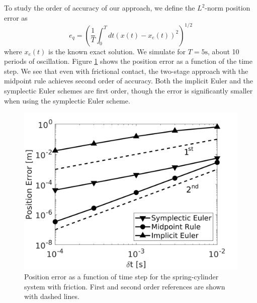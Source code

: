 To study the order of accuracy of our approach, we define the $L^2$-norm
position error as
\begin{equation*}
    e_q = \left(\frac{1}{T}\int_0^T dt(x(t)-x_e(t))^2\right)^{1/2}
\end{equation*}
where $x_e(t)$ is the known exact solution. We simulate for $T=5\text{s}$, about
10 periods of oscillation. Figure \ref{fig:spring_cylinder_position_error} shows
the position error as a function of the time step. We see that even with
frictional contact, the two-stage approach with the midpoint rule achieves
second order of accuracy. Both the implicit Euler and the symplectic Euler
schemes are first order, though the error is significantly smaller when using
the symplectic Euler scheme.
\begin{figure}[!h]
	\centering
	\includegraphics[width=0.7\columnwidth]{figures/spring_cylinder/position_error.png}
	\caption{\label{fig:spring_cylinder_position_error} 
	Position error as a function of time step for the spring-cylinder system
	with friction. First and second order references are shown with dashed
	lines.}
\end{figure}
